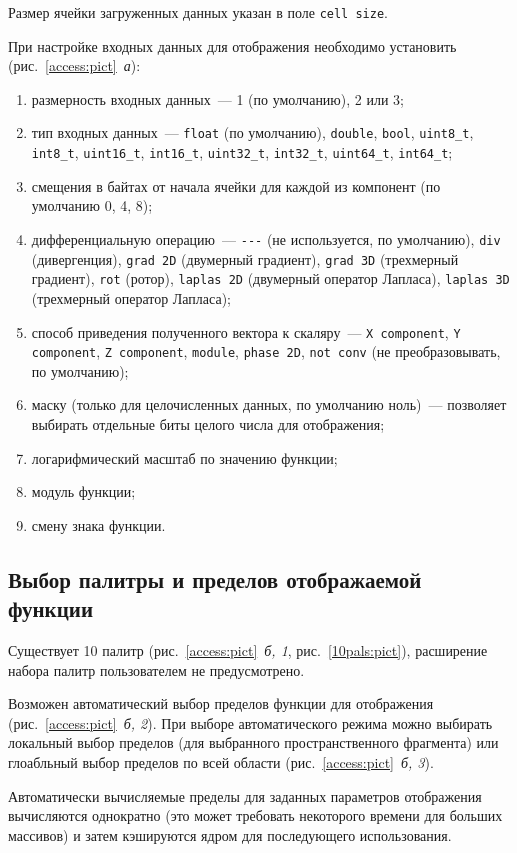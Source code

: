 \documentclass[12pt]{article}
\begin{document}
Размер ячейки загруженных данных указан в поле \verb'cell size'. 

При настройке входных данных для отображения необходимо установить (рис.~\ref{access:pict}~{\it а}):
\begin{enumerate}
\item размерность входных данных~--- 1 (по умолчанию), 2 или 3;
\item тип входных данных~--- \verb'float' (по умолчанию), \verb'double', \verb'bool', \verb'uint8_t', \verb'int8_t', \verb'uint16_t', \verb'int16_t', \verb'uint32_t', \verb'int32_t', \verb'uint64_t', \verb'int64_t';
\item смещения в байтах от начала ячейки для каждой из компонент (по умолчанию 0, 4, 8);
\item дифференциальную операцию~--- \verb'---' (не используется, по умолчанию), \verb'div' (дивергенция),
  \verb'grad 2D' (двумерный градиент), \verb'grad 3D' (трехмерный градиент), \verb'rot' (ротор), \verb'laplas 2D' (двумерный оператор Лапласа),
  \verb'laplas 3D' (трехмерный оператор Лапласа);
\item способ приведения полученного вектора к скаляру~--- \verb'X component', \verb'Y component', \verb'Z component', \verb'module', \verb'phase 2D', \verb'not conv'
  (не преобразовывать, по умолчанию);
\item маску (только для целочисленных данных, по умолчанию ноль)~--- позволяет выбирать отдельные биты
  целого числа для отображения;
\item логарифмический масштаб по значению функции;
\item модуль функции;
\item смену знака функции.
\end{enumerate}


\subsection{Выбор палитры  и пределов отображаемой функции}
Существует 10 палитр (рис.~\ref{access:pict}~{\it б, 1}, рис.~\ref{10pals:pict}), расширение набора палитр пользователем не предусмотрено. 

Возможен автоматический выбор пределов функции для отображения (рис.~\ref{access:pict}~{\it б, 2}).
При выборе автоматического режима можно выбирать локальный выбор пределов (для выбранного пространственного фрагмента)
или глоабльный выбор пределов по всей области (рис.~\ref{access:pict}~{\it б, 3}). 

Автоматически вычисляемые пределы для заданных параметров отображения вычисляются однократно (это может требовать некоторого времени
для больших массивов) и затем кэшируются ядром для последующего использования.
\end{document}
